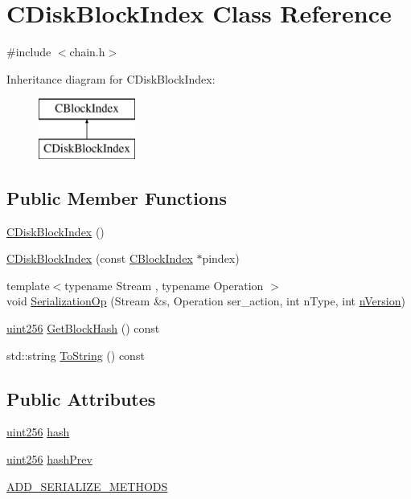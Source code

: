 \hypertarget{class_c_disk_block_index}{}\section{C\+Disk\+Block\+Index Class Reference}
\label{class_c_disk_block_index}


{\ttfamily \#include $<$chain.\+h$>$}

Inheritance diagram for C\+Disk\+Block\+Index\+:\begin{figure}[H]
\begin{center}
\leavevmode
\includegraphics[height=2.000000cm]{class_c_disk_block_index}
\end{center}
\end{figure}
\subsection*{Public Member Functions}
\begin{DoxyCompactItemize}
\item 
\mbox{\hyperlink{class_c_disk_block_index_a8c460c63b799964ef55e2dbbb74b5ad6}{C\+Disk\+Block\+Index}} ()
\item 
\mbox{\hyperlink{class_c_disk_block_index_a8d76af0058fa72d3d8ff688d27d2a5c9}{C\+Disk\+Block\+Index}} (const \mbox{\hyperlink{class_c_block_index}{C\+Block\+Index}} $\ast$pindex)
\item 
{\footnotesize template$<$typename Stream , typename Operation $>$ }\\void \mbox{\hyperlink{class_c_disk_block_index_a2ef7b51f2777fcc1b9625a0ee000f9b5}{Serialization\+Op}} (Stream \&s, Operation ser\+\_\+action, int n\+Type, int \mbox{\hyperlink{class_c_block_index_a45126301a0a6e26010527a7bbfc1ef58}{n\+Version}})
\item 
\mbox{\hyperlink{classuint256}{uint256}} \mbox{\hyperlink{class_c_disk_block_index_acc607a9082c558d7301077631b66122b}{Get\+Block\+Hash}} () const
\item 
std\+::string \mbox{\hyperlink{class_c_disk_block_index_a347eafa0667f8641f73062b48c217d61}{To\+String}} () const
\end{DoxyCompactItemize}
\subsection*{Public Attributes}
\begin{DoxyCompactItemize}
\item 
\mbox{\hyperlink{classuint256}{uint256}} \mbox{\hyperlink{class_c_disk_block_index_a1c4a32dec25c474353aa3286de318224}{hash}}
\item 
\mbox{\hyperlink{classuint256}{uint256}} \mbox{\hyperlink{class_c_disk_block_index_a3a1730201a8523fb947c4d4f632a4212}{hash\+Prev}}
\item 
\mbox{\hyperlink{class_c_disk_block_index_adfa97e82f2e6db827fc6b8b5e351a1f9}{A\+D\+D\+\_\+\+S\+E\+R\+I\+A\+L\+I\+Z\+E\+\_\+\+M\+E\+T\+H\+O\+DS}}
\end{DoxyCompactItemize}
